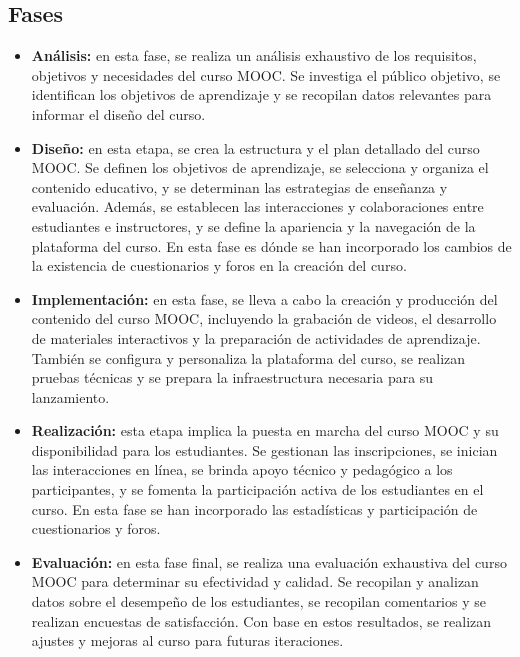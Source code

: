 \subsection{Fases}
\begin{itemize}
	\item \textbf{Análisis:}
	en esta fase, se realiza un análisis exhaustivo de los requisitos, objetivos y necesidades del curso MOOC. Se investiga el público objetivo, se identifican los objetivos de aprendizaje y se recopilan datos relevantes para informar el diseño del curso.
	\item \textbf{Diseño:}
	en esta etapa, se crea la estructura y el plan detallado del curso MOOC. Se definen los objetivos de aprendizaje, se selecciona y organiza el contenido educativo, y se determinan las estrategias de enseñanza y evaluación. Además, se establecen las interacciones y colaboraciones entre estudiantes e instructores, y se define la apariencia y la navegación de la plataforma del curso. En esta fase es dónde se han incorporado los cambios de la existencia de cuestionarios y foros en la creación del curso.
	\item \textbf{Implementación:}
	en esta fase, se lleva a cabo la creación y producción del contenido del curso MOOC, incluyendo la grabación de videos, el desarrollo de materiales interactivos y la preparación de actividades de aprendizaje. También se configura y personaliza la plataforma del curso, se realizan pruebas técnicas y se prepara la infraestructura necesaria para su lanzamiento.
	\item \textbf{Realización:}
	esta etapa implica la puesta en marcha del curso MOOC y su disponibilidad para los estudiantes. Se gestionan las inscripciones, se inician las interacciones en línea, se brinda apoyo técnico y pedagógico a los participantes, y se fomenta la participación activa de los estudiantes en el curso. En esta fase se han incorporado las estadísticas y participación de cuestionarios y foros.
	\item \textbf{Evaluación:}
	en esta fase final, se realiza una evaluación exhaustiva del curso MOOC para determinar su efectividad y calidad. Se recopilan y analizan datos sobre el desempeño de los estudiantes, se recopilan comentarios y se realizan encuestas de satisfacción. Con base en estos resultados, se realizan ajustes y mejoras al curso para futuras iteraciones.
\end{itemize}


